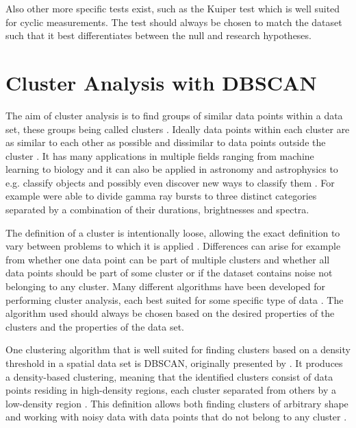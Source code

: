 \documentclass[english, oneside]{HYgradu}
\begin{document}
Also other more specific tests exist, such as the Kuiper test which is well suited for cyclic measurements. The test should always be chosen to match the dataset such that it best differentiates between the null and research hypotheses.

\section{Cluster Analysis with DBSCAN} \label{sect:cluster-analysis}
The aim of cluster analysis is to find groups of similar data points within a data set, these groups being called clusters \citep{han2000data}. Ideally data points within each cluster are as similar to each other as possible and dissimilar to data points outside the cluster \citep{han2000data}. It has many applications in multiple fields ranging from machine learning to biology and it can also be applied in astronomy and astrophysics to e.g. classify objects and possibly even discover new ways to classify them \citep{ball2010data, han2000data}. For example \citet{mukherjee1998three} were able to divide gamma ray bursts to three distinct categories separated by a combination of their durations, brightnesses and spectra.

The definition of a cluster is intentionally loose, allowing the exact definition to vary between problems to which it is applied \citep{tan2006introduction}. Differences can arise for example from whether one data point can be part of multiple clusters and whether all data points should be part of some cluster or if the dataset contains noise not belonging to any cluster. Many different algorithms have been developed for performing cluster analysis, each best suited for some specific type of data \citep{han2000data}. The algorithm used should always be chosen based on the desired properties of the clusters and the properties of the data set.

One clustering algorithm that is well suited for finding clusters based on a density threshold in a spatial data set is DBSCAN, originally presented by \citet{ester1996density}. It produces a density-based clustering, meaning that the identified clusters consist of data points residing in high-density regions, each cluster separated from others by a low-density region \citep{han2000data}. This definition allows both finding clusters of arbitrary shape and working with noisy data with data points that do not belong to any cluster \citep{ester1996density}.
\end{document}
